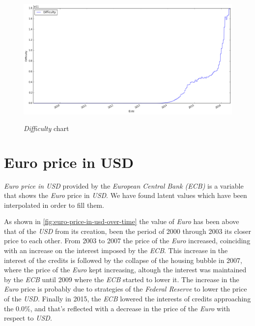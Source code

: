 \begin{figure}[bth]
  \myfloatalign
  {\includegraphics[width=1\linewidth]
    {gfx/difficulty-over-time}}
  \caption{\textit{Difficulty} chart}
  \label{fig:difficulty-over-time}
\end{figure}


\section{Euro price in USD}
\label{sec:euro-price-in-usd}


\textit{Euro price in USD} provided by the \textit{European Central
Bank (ECB)} is a variable that shows the \textit{Euro} price in
\textit{USD}. We have found latent values which have been interpolated
in order to fill them.

As shown in \autoref{fig:euro-price-in-usd-over-time} the value of
\textit{Euro} has been above that of the \textit{USD} from its
creation, been the period of 2000 through 2003 its closer price to
each other. From 2003 to 2007 the price of the \textit{Euro}
increased, coinciding with an increase on the interest imposed by the
\textit{ECB}. This increase in the interest of the credits is followed
by the collapse of the housing bubble in 2007, where the price of the
\textit{Euro} kept increasing, altough the interest was maintained by
the \textit{ECB} until 2009 where the \textit{ECB} started to lower
it. The increase in the \textit{Euro} price is probably due to
strategies of the \textit{Federal Reserve} to lower the price of the
\textit{USD}. Finally in 2015, the \textit{ECB} lowered the interests
of credits approaching the $0.0\%$, and that's reflected with a
decrease in the price of the \textit{Euro} with respect to
\textit{USD}.

